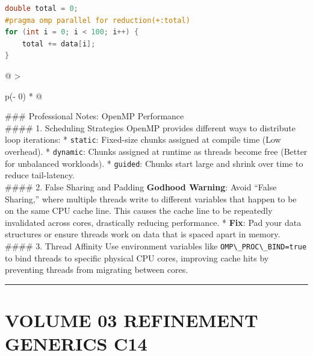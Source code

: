 \begin{lstlisting}[language={C++}]
double total = 0;
#pragma omp parallel for reduction(+:total)
for (int i = 0; i < 100; i++) {
    total += data[i];
}
\end{lstlisting}

\begin{longtable}[]{@{}
  >{\raggedright\arraybackslash}p{(\columnwidth - 0\tabcolsep) * }@{}}
\toprule
\endhead
\#\#\# Professional Notes: OpenMP Performance \\
\#\#\#\# 1. Scheduling Strategies OpenMP provides different ways to
distribute loop iterations: * \passthrough{\lstinline!static!}:
Fixed-size chunks assigned at compile time (Low overhead). *
\passthrough{\lstinline!dynamic!}: Chunks assigned at runtime as threads
become free (Better for unbalanced workloads). *
\passthrough{\lstinline!guided!}: Chunks start large and shrink over
time to reduce tail-latency. \\
\#\#\#\# 2. False Sharing and Padding \textbf{Godhood Warning}: Avoid
``False Sharing,'' where multiple threads write to different variables
that happen to be on the same CPU cache line. This causes the cache line
to be repeatedly invalidated across cores, drastically reducing
performance. * \textbf{Fix}: Pad your data structures or ensure threads
work on data that is spaced apart in memory. \\
\#\#\#\# 3. Thread Affinity Use environment variables like
\passthrough{\lstinline!OMP\_PROC\_BIND=true!} to bind threads to
specific physical CPU cores, improving cache hits by preventing threads
from migrating between cores. \\
\bottomrule
\end{longtable}

\begin{center}\rule{0.5\linewidth}{0.5pt}\end{center}

\hypertarget{volume-03-refinement-generics-c14}{%
\chapter{VOLUME 03 REFINEMENT GENERICS
C14}\label{volume-03-refinement-generics-c14}}
